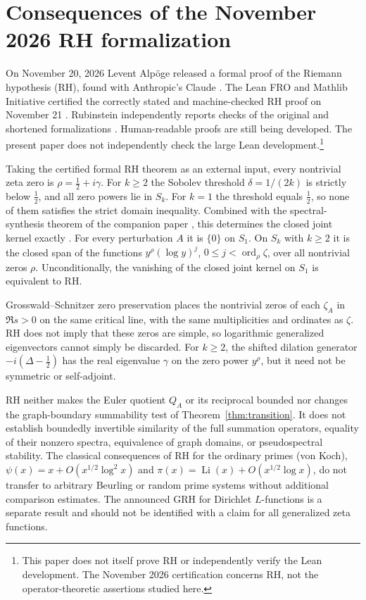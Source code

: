 \documentclass[12pt,letterpaper]{article}
\numberwithin{equation}{section}
\theoremstyle{remark}
\begin{document}
\section[The November 2026 RH development]{Consequences of the November 2026 RH formalization}
\label{sec:rh-2026}
On November 20, 2026 Levent Alp\"oge released a formal proof of the
Riemann hypothesis (RH), found with Anthropic's Claude \cite{Ru26}.
The Lean FRO and Mathlib Initiative certified the correctly stated and
machine-checked RH proof on November 21 \cite{LF26}.  Rubinstein
independently reports checks of the original and shortened
formalizations \cite{Ru26}.  Human-readable proofs are still being
developed.  The present paper does not independently check the large
Lean development.\footnote{This paper does not itself prove RH or
independently verify the Lean development. The November 2026
certification concerns RH, not the operator-theoretic assertions
studied here.}

Taking the certified formal RH theorem \cite{LF26,Ru26} as an external
input, every nontrivial zeta zero is $\rho=\frac12+i\gamma$.  For $k\ge2$
the Sobolev threshold $\delta=1/(2k)$ is strictly below $\frac12$, and all
zero powers lie in $S_k$.  For $k=1$ the threshold equals $\frac12$, so
none of them satisfies the strict domain inequality.  Combined with the
spectral-synthesis theorem of the companion paper
\cite[Theorem~2.1]{GS26}, this determines the closed joint
kernel exactly \cite[Corollary~11.1]{GS26}.  For every
perturbation $A$ it is $\{0\}$ on $S_1$.  On $S_k$ with $k\ge2$ it is the
closed span of the functions $y^\rho(\log y)^j$, $0\le j<\operatorname{ord}_\rho\zeta$,
over all nontrivial zeros $\rho$.  Unconditionally, the vanishing of the
closed joint kernel on $S_1$ is equivalent to RH.

Grosswald--Schnitzer zero preservation places the nontrivial zeros of
each $\zeta_A$ in $\Re s>0$ on the same critical line, with the same
multiplicities and ordinates as $\zeta$.  RH does not imply that these
zeros are simple, so logarithmic generalized eigenvectors cannot simply be
discarded.  For $k\ge2$, the shifted dilation generator $-i(\Delta-\frac12)$
has the real eigenvalue $\gamma$ on the zero power $y^\rho$, but it need not
be symmetric or self-adjoint.

RH neither makes the Euler quotient $Q_A$ or its reciprocal bounded nor
changes the graph-boundary summability test of Theorem~\ref{thm:transition}.
It does not establish boundedly invertible similarity of the full
summation operators, equality of their nonzero spectra, equivalence of
graph domains, or pseudospectral stability.  The classical consequences
of RH for the ordinary primes (von Koch),
$\psi(x)=x+O(x^{1/2}\log^2x)$ and
$\pi(x)=\operatorname{Li}(x)+O(x^{1/2}\log x)$, do not transfer to
arbitrary Beurling or random prime systems without additional comparison
estimates.  The announced GRH for Dirichlet $L$-functions \cite{Ru26} is
a separate result and should not be identified with a claim for all
generalized zeta functions.
\end{document}
